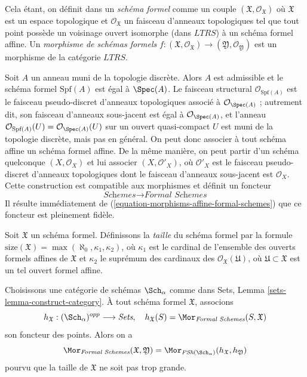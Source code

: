 \medskip\noindent
Cela étant, on définit dans \cite{EGA} un {\it schéma formel} comme un couple
$(\mathfrak X, \mathcal{O}_\mathfrak X)$ où $\mathfrak X$
est un espace topologique et $\mathcal{O}_\mathfrak X$ un faisceau
d'anneaux topologiques tel que tout point possède un voisinage ouvert
isomorphe (dans $LTRS$) à un schéma formel affine.
Un {\it morphisme de schémas formels}
$f : (\mathfrak X, \mathcal{O}_\mathfrak X) \to
(\mathfrak Y, \mathcal{O}_\mathfrak Y)$
est un morphisme de la catégorie $LTRS$.

\medskip\noindent
Soit $A$ un anneau muni de la topologie discrète. Alors $A$ est
admissible et le schéma formel $\text{Spf}(A)$ est égal à
$\Spec(A)$. Le faisceau structural $\mathcal{O}_{\text{Spf}(A)}$
est le faisceau pseudo-discret d'anneaux topologiques associé
à $\mathcal{O}_{\Spec(A)}$ ; autrement dit, son faisceau
d'anneaux sous-jacent est égal à $\mathcal{O}_{\Spec(A)}$, et l'anneau
$\mathcal{O}_{\text{Spf}(A)}(U) = \mathcal{O}_{\Spec(A)}(U)$
sur un ouvert quasi-compact $U$ est muni de la topologie discrète,
mais pas en général. On peut donc associer à tout schéma affine
un schéma formel affine. De la même manière, on peut partir
d'un schéma quelconque $(X, \mathcal{O}_X)$ et lui associer
$(X, \mathcal{O}'_X)$, où $\mathcal{O}'_X$ est le
faisceau pseudo-discret d'anneaux topologiques dont le faisceau
d'anneaux sous-jacent est $\mathcal{O}_X$. Cette construction est
compatible aux morphismes et définit un foncteur
\begin{equation}
\label{equation-compare-schemes-formal-schemes}
\textit{Schemes} \longrightarrow \textit{Formal Schemes}
\end{equation}
Il résulte immédiatement de
(\ref{equation-morphisms-affine-formal-schemes})
que ce foncteur est pleinement fidèle.

\medskip\noindent
Soit $\mathfrak X$ un schéma formel. Définissons la {\it taille}
du schéma formel par la formule
$\text{size}(\mathfrak X) = \max(\aleph_0, \kappa_1, \kappa_2)$,
où $\kappa_1$ est le cardinal de l'ensemble des ouverts formels affines de
$\mathfrak X$ et $\kappa_2$ le suprémum des cardinaux
des $\mathcal{O}_\mathfrak X(\mathfrak U)$, où
$\mathfrak U \subset \mathfrak X$ est un tel ouvert formel affine.

\begin{lemma}
\label{lemma-fully-faithful}
Choisissons une catégorie de schémas $\Sch_\alpha$
comme dans Sets, Lemma \ref{sets-lemma-construct-category}.
À tout schéma formel $\mathfrak X$, associons
$$
h_\mathfrak X : (\Sch_\alpha)^{opp} \longrightarrow \textit{Sets},\quad
h_\mathfrak X(S) = \Mor_{\textit{Formal Schemes}}(S, \mathfrak X)
$$
son foncteur des points. Alors on a
$$
\Mor_{\textit{Formal Schemes}}(\mathfrak X, \mathfrak Y) =
\Mor_{\textit{PSh}(\Sch_\alpha)}(h_\mathfrak X, h_\mathfrak Y)
$$
pourvu que la taille de $\mathfrak X$ ne soit pas trop grande.
\end{lemma}

